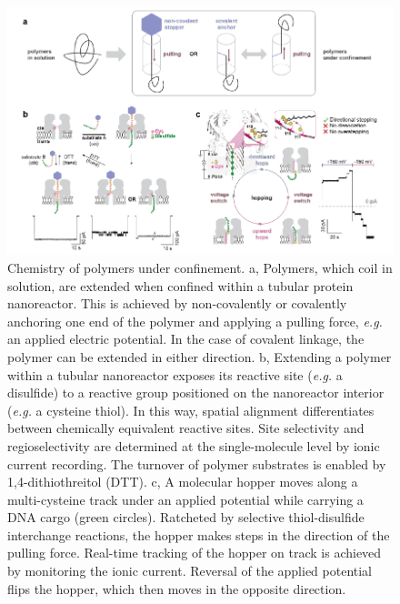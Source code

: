 \begin{figure}[!htbp]
	\centering
	\includegraphics[width=1\linewidth]{figures/Figure6.3.pdf}
	\caption{Chemistry of polymers under confinement. a, Polymers, which coil in solution, are extended when confined within a tubular protein nanoreactor. This is achieved by non-covalently or covalently anchoring one end of the polymer and applying a pulling force, \emph{e.g.} an applied electric potential. In the case of covalent linkage, the polymer can be extended in either direction. b, Extending a polymer within a tubular nanoreactor exposes its reactive site (\emph{e.g.} a disulfide) to a reactive group positioned on the nanoreactor interior (\emph{e.g.} a cysteine thiol). In this way, spatial alignment differentiates between chemically equivalent reactive sites. Site selectivity and regioselectivity are determined at the single-molecule level by ionic current recording. The turnover of polymer substrates is enabled by 1,4-dithiothreitol (DTT). c, A molecular hopper moves along a multi-cysteine track under an applied potential while carrying a DNA cargo (green circles). Ratcheted by selective thiol-disulfide interchange reactions, the hopper makes steps in the direction of the pulling force. Real-time tracking of the hopper on track is achieved by monitoring the ionic current. Reversal of the applied potential flips the hopper, which then moves in the opposite direction.}
	\label{fig:fig6.3}
\end{figure}

